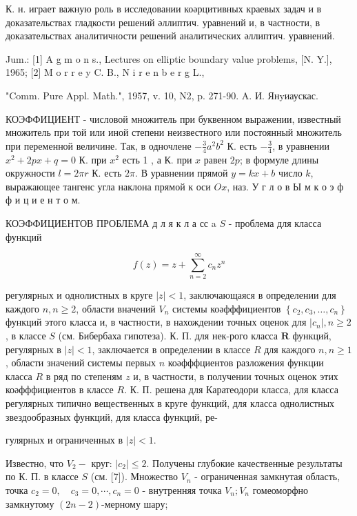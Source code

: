 \documentclass[10pt]{article}
\begin{document}
К. н. играет важную роль в исследовании коәрцитивных краевых задач и в доказательствах гладкости решений әллиптич. уравнений и, в частности, в доказательствах аналитичности решений аналитических әллиптич. уравнений.



Jum.: [1] A g m o n s., Lectures on elliptic boundary value problems, [N. Y.], 1965; [2] M o r r e y C. B., N i r e n b e r g L.,

"Comm. Pure Appl. Math.", 1957, v. 10, N2, p. 271-90. A. И. Янyиаускас.



КОЭФФИЦИЕНТ - числовой множитель при буквенном выражении, известный множитель при той или иной степени неизвестного или постоянный множитель при переменной величине. Так, в одночлене $-\frac{3}{4} a^{2} b^{2}$ К. есть $-\frac{3}{4}$, в уравнении $x^{2}+2 p x+q=0$ К. при $x^{2}$ есть 1 , а К. при $x$ равен $2 p$; в формуле длины окружности $l=2 \pi r$ К. есть $2 \pi$. В уравнении прямой $y=k x+b$ число $k$, выражающее тангенс угла наклона прямой к оси $O x$, наз. У г л о в Ы м к о э ф ф и ц и е н т о м.



КОЭФФИЦИЕНТОВ ПРОБЛЕМА д л я к л а сс a $S$ - проблема для класса функций



\[

f(z)=z+\sum_{n=2}^{\infty} c_{n} z^{n}

\]



регулярных и однолистных в круге $|z|<1$, заключающаяся в определении для каждого $n, n \geqslant 2$, области вначений $V_{n}$ системы коәфффициентов $\left\{c_{2}, c_{3}, \ldots, c_{n}\right\}$ функций этого класса и, в частности, в нахождении точных оценок для $\left|c_{n}\right|, n \geqslant 2$, в классе $S$ (см. Бибербаха гипотеза). К. П. для нек-рого класса $\boldsymbol{R}$ функций, регулярных в $|z|<1$, заключается в определении в классе $R$ для каждого $n, n \geqslant 1$, области значений системы первых $n$ коәфффциентов разложения функции класса $R$ в ряд по степеням $z$ и, в частности, в получении точных оценок этих коәфффициентов в классе $R$. К. П. решена для Каратеодори класса, для класса регулярных типично вещественных в круге функций, для класса однолистных звездообразных функций, для класса функций, ре-

гулярных и ограниченных в $|z|<1$.



Известно, что $V_{2}-$ круг: $\left|c_{2}\right| \leqslant 2$. Получены глубокие качественные результаты по К. П. в классе $S$ (см. [7]). Множество $V_{n}$ - ограниченная замкнутая область, точка $c_{2}=0, \quad c_{3}=0, \cdots, c_{n}=0$ - внутренняя точка $V_{n} ; V_{n}$ гомеоморфно замкнутому $(2 n-2)$-мерному шару;
\end{document}
